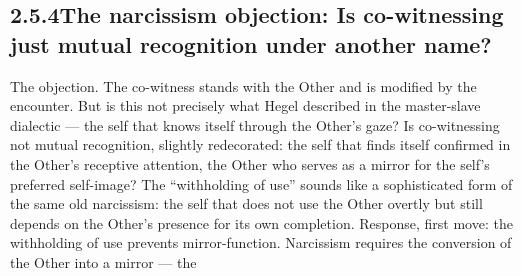 \subsection{2.5.4\quad The narcissism objection: Is co-witnessing just mutual recognition under another name?}

The objection. The co-witness stands with the Other and is modified by the encounter. But is this not precisely what Hegel described in the master-slave dialectic — the self that knows itself through the Other’s gaze? Is co-witnessing not mutual recognition, slightly redecorated: the self that finds itself confirmed in the Other’s receptive attention, the Other who serves as a mirror for the self’s preferred self-image? The “withholding of use” sounds like a sophisticated form of the same old narcissism: the self that does not use the Other overtly but still depends on the Other’s presence for its own completion. Response, first move: the withholding of use prevents mirror-function. Narcissism requires the conversion of the Other into a mirror — the

